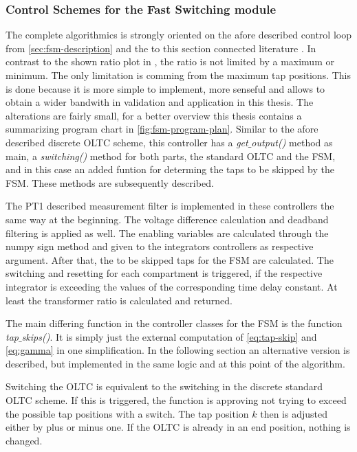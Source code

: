 \subsubsection{Control Schemes for the Fast Switching module}

The complete algorithmics is strongly oriented on the afore described control loop from \autoref{sec:fsm-description} and the to this section connected literature \autocite{burlakin_2024,burlakin_2024a,maschinenfabrikreinhausengmbh_2023}.
In contrast to the shown ratio plot in \textcite{burlakin_2024}, the ratio is not limited by a maximum or minimum.
The only limitation is comming from the maximum tap positions.
This is done because it is more simple to implement, more senseful and allows to obtain a wider bandwith in validation and application in this thesis.
The alterations are fairly small, for a better overview this thesis contains a summarizing program chart in \autoref{fig:fsm-program-plan}.
Similar to the afore described discrete \acs{OLTC} scheme, this controller has a \textit{get$\_$output()} method as main, a \textit{switching()} method for both parts, the standard \acs{OLTC} and the \acs{FSM}, and in this case an added funtion for determing the taps to be skipped by the \acs{FSM}.
These methods are subsequently described.

The PT1 described measurement filter is implemented in these controllers the same way at the beginning.
The voltage difference calculation and deadband filtering is applied as well.
The enabling variables are calculated through the numpy sign method and given to the integrators controllers as respective argument.
After that, the to be skipped taps for the \acs{FSM} are calculated.
The switching and resetting for each compartment is triggered, if the respective integrator is exceeding the values of the corresponding time delay constant.
At least the transformer ratio is calculated and returned.

The main differing function in the controller classes for the \acs{FSM} is the function \textit{tap$\_$skips()}.
It is simply just the external computation of \autoref{eq:tap-skip} and \autoref{eq:gamma} in one simplification.
In the following section an alternative version is described, but implemented in the same logic and at this point of the algorithm.

Switching the \acs{OLTC} is equivalent to the switching in the discrete standard \acs{OLTC} scheme.
If this is triggered, the function is approving not trying to exceed the possible tap positions with a switch.
The tap position $k$ then is adjusted either by plus or minus one.
If the \acs{OLTC} is already in an end position, nothing is changed.

